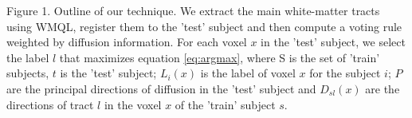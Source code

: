 Figure 1. Outline of our technique. We extract the main white-matter tracts using WMQL, register them to the 'test' subject and then compute a voting rule weighted by diffusion information. For each voxel $x$ in the 'test' subject, we select the label $l$ that maximizes equation \ref{eq:argmax}, where S is the set of 'train' subjects, $t$ is the 'test' subject; $L_i(x)$ is the label of voxel $x$ for the subject $i$; $P$ are the principal directions of diffusion in the 'test' subject and $D_{sl}(x)$ are the directions of tract $l$ in the voxel $x$ of the 'train' subject $s$.

\chapterbib
